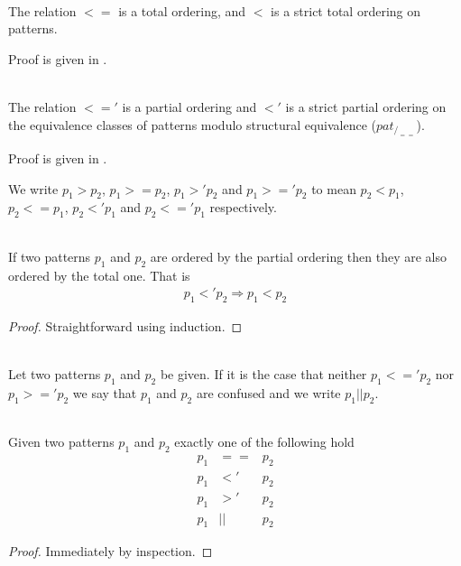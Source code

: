 \begin{lemma}\ \\
  \label{lem:pat-total-orderings}
  The relation $<=$ is a total ordering, and $<$ is a strict total ordering on
  patterns.

  Proof is given in .
\end{lemma}


\begin{lemma}\ \\
  \label{lem:pat-partial-orderings}
  The relation $<='$ is a partial ordering and $<'$ is a strict partial ordering
  on the equivalence classes of patterns modulo structural equivalence
  ($pat_{/_{==}}$).

  Proof is given in .
\end{lemma}

We write $p_1 > p_2$, $p_1 >= p_2$, $p_1 >' p_2$ and $p_1 >=' p_2$ to mean $p_2
< p_1$, $p_2 <= p_1$, $p_2 <' p_1$ and $p_2 <=' p_1$ respectively.

\begin{lemma}[]\ \\
  \label{lem:total-implies-partial}
  If two patterns $p_1$ and $p_2$ are ordered by the partial ordering then they
  are also ordered by the total one. That is
  \begin{eqnarray*}
    p_1 <' p_2 \Longrightarrow p_1 < p_2
  \end{eqnarray*}
\end{lemma}
\begin{proof}
  Straightforward using induction.
\end{proof}

\begin{definition}[Confusion, $||$]\ \\
  \label{def:pat-confusion}
  Let two patterns $p_1$ and $p_2$ be given. If it is the case that neither $p_1
  <=' p_2$ nor $p_1 >=' p_2$ we say that $p_1$ and $p_2$ are confused and we
  write $p_1 || p_2$.
\end{definition}

\begin{lemma}\ \\
  \label{lem:unique-rel}
  Given two patterns $p_1$ and $p_2$ exactly one of the following hold
  \begin{eqnarray*}
    p_1 &==& p_2\\
    p_1 &<'& p_2\\
    p_1 &>'& p_2\\
    p_1 &||& p_2
  \end{eqnarray*}
\end{lemma}
\begin{proof}
  Immediately by inspection.
\end{proof}

